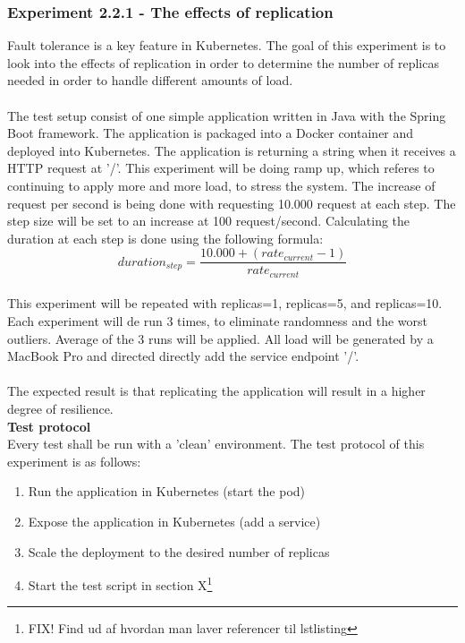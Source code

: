 \subsubsection*{Experiment 2.2.1 - The effects of replication}
\label{sec:experiment:effects_of_replication}
Fault tolerance is a key feature in Kubernetes. The goal of this experiment is to look into the effects of replication in order to determine the number of replicas needed in order to handle different amounts of load. \\ \\
\noindent The test setup consist of one simple application written in Java with the Spring Boot framework. The application is packaged into a Docker container and deployed into Kubernetes. The application is returning a string when it receives a HTTP request at '/'. This experiment will be doing ramp up, which referes to continuing to apply more and more load, to stress the system. The increase of request per second is being done with requesting 10.000 request at each step. The step size will be set to an increase at 100 request/second. Calculating the duration at each step is done using the following formula: \\

\[ duration_{step}
  = \dfrac{10.000 + (rate_{current}-1)}{rate_{current}}
\] \\

\noindent This experiment will be repeated with replicas=1, replicas=5, and replicas=10. Each experiment will de run 3 times, to eliminate randomness and the worst outliers. Average of the 3 runs will be applied. All load will be generated by a MacBook Pro and directed directly add the service endpoint '/'. \\ \\
\noindent The expected result is that replicating the application will result in a higher degree of resilience.\\

\noindent\textbf{Test protocol}\\
Every test shall be run with a 'clean' environment. The test protocol of this experiment is as follows:

\begin{enumerate}
  \item Run the application in Kubernetes (start the pod)
  \item Expose the application in Kubernetes (add a service)
  \item Scale the deployment to the desired number of replicas
  \item Start the test script in section X\footnote{FIX! Find ud af hvordan man laver referencer til lstlisting}
\end{enumerate}

